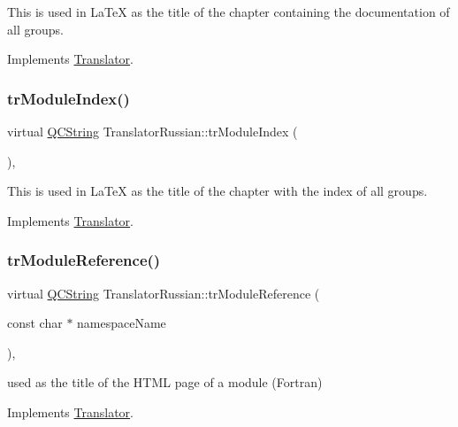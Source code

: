 This is used in La\+TeX as the title of the chapter containing the documentation of all groups. 

Implements \mbox{\hyperlink{class_translator}{Translator}}.

\mbox{\label{class_translator_russian_a7d42100f531c9628189ff66b552a57c7}} 
\subsubsection{\texorpdfstring{trModuleIndex()}{trModuleIndex()}}
{\footnotesize\ttfamily virtual \mbox{\hyperlink{class_q_c_string}{Q\+C\+String}} Translator\+Russian\+::tr\+Module\+Index (\begin{DoxyParamCaption}{ }\end{DoxyParamCaption})\hspace{0.3cm}{\ttfamily [inline]}, {\ttfamily [virtual]}}

This is used in La\+TeX as the title of the chapter with the index of all groups. 

Implements \mbox{\hyperlink{class_translator}{Translator}}.

\mbox{\label{class_translator_russian_a2849ae1d2cfef0b9f4016b72983f897a}} 
\subsubsection{\texorpdfstring{trModuleReference()}{trModuleReference()}}
{\footnotesize\ttfamily virtual \mbox{\hyperlink{class_q_c_string}{Q\+C\+String}} Translator\+Russian\+::tr\+Module\+Reference (\begin{DoxyParamCaption}\item[{const char $\ast$}]{namespace\+Name }\end{DoxyParamCaption})\hspace{0.3cm}{\ttfamily [inline]}, {\ttfamily [virtual]}}

used as the title of the H\+T\+ML page of a module (Fortran) 

Implements \mbox{\hyperlink{class_translator}{Translator}}.


